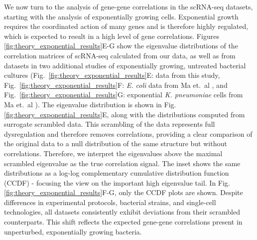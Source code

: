 \documentclass[12pt]{article}
\begin{document}
We now turn to the analysis of gene-gene correlations in the scRNA-seq datasets, starting with the analysis of exponentially growing cells. Exponential growth requires the coordinated action of many genes and is therefore highly regulated, which is expected to result in a high level of gene correlations. Figures \ref{fig:theory_exponential_results}E-G show the eigenvalue distributions of the correlation matrices of scRNA-seq calculated from our data, as well as from datasets in two additional studies of exponentially growing, untreated bacterial cultures (Fig.~\ref{fig:theory_exponential_results}E: data from this study, Fig.~\ref{fig:theory_exponential_results}F: \textit{E. coli} data from Ma et.~al \cite{Deborah_cell_2023}, and Fig.~\ref{fig:theory_exponential_results}G: exponential \textit{K. pneumoniae} cells from Ma et.~al \cite{Deborah_cell_2023}). The eigenvalue distribution is shown in Fig.\ref{fig:theory_exponential_results}E, along with the distributions computed from surrogate scrambled data. This scrambling of the data represents full dysregulation and therefore removes correlations, providing a clear comparison of the original data to a null distribution of the same structure but without correlations. Therefore, we interpret the eigenvalues above the maximal scrambled eigenvalue as the true correlation signal.  The inset shows the same distributions as a log-log complementary cumulative distribution function (CCDF) - focusing the view on the important high eigenvalue tail. In Fig. \ref{fig:theory_exponential_results}F-G, only the CCDF plots are shown. Despite differences in experimental protocols, bacterial strains, and single-cell technologies, all datasets consistently exhibit deviations from their scrambled counterparts. This shift reflects the expected gene-gene correlations present in unperturbed, exponentially growing bacteria.\par
\end{document}
